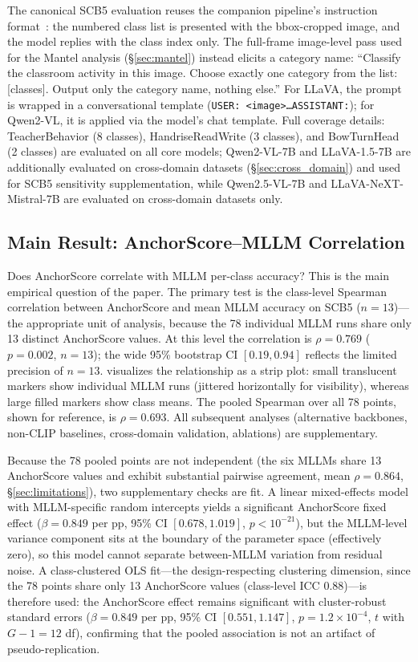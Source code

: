 \documentclass[11pt,a4paper]{article}
\begin{document}
The canonical SCB5 evaluation reuses the companion pipeline's instruction format~\cite{ma2026agreement}: the numbered class list is presented with the bbox-cropped image, and the model replies with the class index only. The full-frame image-level pass used for the Mantel analysis (\S\ref{sec:mantel}) instead elicits a category name: ``Classify the classroom activity in this image. Choose exactly one category from the list: [classes]. Output only the category name, nothing else.'' For LLaVA, the prompt is wrapped in a conversational template (\texttt{USER: <image>\ldots ASSISTANT:}); for Qwen2-VL, it is applied via the model's chat template. Full coverage details: TeacherBehavior (8 classes), HandriseReadWrite (3 classes), and BowTurnHead (2 classes) are evaluated on all core models; Qwen2-VL-7B and LLaVA-1.5-7B are additionally evaluated on cross-domain datasets (\S\ref{sec:cross_domain}) and used for SCB5 sensitivity supplementation, while Qwen2.5-VL-7B and LLaVA-NeXT-Mistral-7B are evaluated on cross-domain datasets only.

\subsection{Main Result: AnchorScore--MLLM Correlation}
\label{sec:main_result}

Does AnchorScore correlate with MLLM per-class accuracy? This is the main empirical question of the paper. The primary test is the class-level Spearman correlation between AnchorScore and mean MLLM accuracy on SCB5 ($n=13$)---the appropriate unit of analysis, because the 78 individual MLLM runs share only 13 distinct AnchorScore values. At this level the correlation is $\rho=0.769$ ($p=0.002$, $n=13$); the wide 95\% bootstrap CI $[0.19, 0.94]$ reflects the limited precision of $n=13$.  visualizes the relationship as a strip plot: small translucent markers show individual MLLM runs (jittered horizontally for visibility), whereas large filled markers show class means. The pooled Spearman over all 78 points, shown for reference, is $\rho=0.693$. All subsequent analyses (alternative backbones, non-CLIP baselines, cross-domain validation, ablations) are supplementary.

Because the 78 pooled points are not independent (the six MLLMs share 13 AnchorScore values and exhibit substantial pairwise agreement, mean $\rho=0.864$, \S\ref{sec:limitations}), two supplementary checks are fit. A linear mixed-effects model with MLLM-specific random intercepts yields a significant AnchorScore fixed effect ($\beta=0.849$ per pp, 95\% CI $[0.678, 1.019]$, $p<10^{-21}$), but the MLLM-level variance component sits at the boundary of the parameter space (effectively zero), so this model cannot separate between-MLLM variation from residual noise. A class-clustered OLS fit---the design-respecting clustering dimension, since the 78 points share only 13 AnchorScore values (class-level ICC 0.88)---is therefore used: the AnchorScore effect remains significant with cluster-robust standard errors ($\beta=0.849$ per pp, 95\% CI $[0.551, 1.147]$, $p=1.2\times10^{-4}$, $t$ with $G-1=12$ df), confirming that the pooled association is not an artifact of pseudo-replication.
\end{document}
